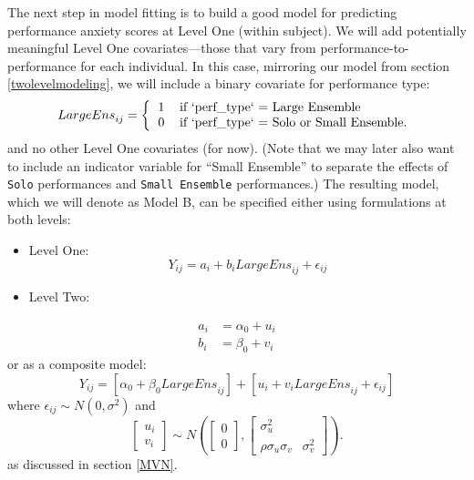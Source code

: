 \documentclass[
]{krantz}
\providecommand{\tightlist}{%
  \setlength{\itemsep}{0pt}\setlength{\parskip}{0pt}}
\begin{document}
The next step in model fitting is to build a good model for predicting performance anxiety scores at Level One (within subject). We will add potentially meaningful Level One covariates---those that vary from performance-to-performance for each individual. In this case, mirroring our model from section \ref{twolevelmodeling}, we will include a binary covariate for performance type:
\[ \textstyle{LargeEns}_{ij} =
\left\lbrace
\begin{tabular}{l l} 
1 & if `perf\_type` = Large Ensemble \\
0 & if `perf\_type` = Solo or Small Ensemble. 
\end{tabular}\right.
\]
and no other Level One covariates (for now). (Note that we may later also want to include an indicator variable for ``Small Ensemble'' to separate the effects of \texttt{Solo} performances and \texttt{Small\ Ensemble} performances.) The resulting model, which we will denote as Model B, can be specified either using formulations at both levels:

\begin{itemize}
\tightlist
\item
  Level One:
  \begin{equation}
  Y_{ij} = a_{i}+b_{i}\textstyle{LargeEns}_{ij}+\epsilon_{ij}
  \label{eq:level1modelb}
  \end{equation}
\item
  Level Two:
\end{itemize}

\begin{align*}
a_{i} & = \alpha_{0}+u_{i} \\
b_{i} & = \beta_{0}+v_{i}
\end{align*}
or as a composite model:
\begin{equation}
Y_{ij}=[\alpha_{0}+\beta_{0}\textstyle{LargeEns}_{ij}]+[u_{i}+v_{i}\textstyle{LargeEns}_{ij}+\epsilon_{ij}]
\label{eq:compmodelb}
\end{equation}
where \(\epsilon_{ij}\sim N(0,\sigma^2)\) and
\[ \left[ \begin{array}{c}
            u_{i} \\ v_{i}
          \end{array}  \right] \sim N \left( \left[
          \begin{array}{c}
            0 \\ 0
          \end{array} \right], \left[
          \begin{array}{cc}
            \sigma_{u}^{2} & \\
            \rho\sigma_{u}\sigma_{v} & \sigma_{v}^{2}
          \end{array} \right] \right). \]
as discussed in section \ref{MVN}.
\end{document}
